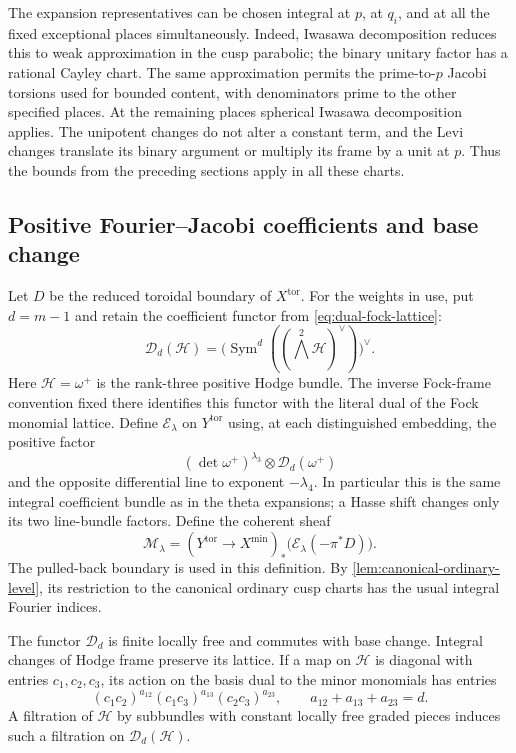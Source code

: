 The expansion representatives can be chosen integral at $p$, at
$q_i$, and at all the fixed exceptional places simultaneously.
Indeed, Iwasawa decomposition reduces this to weak approximation in
the cusp parabolic; the binary unitary factor has a rational Cayley
chart.  The same approximation permits the prime-to-$p$ Jacobi
torsions used for bounded content, with denominators prime to the
other specified places.  At the remaining places spherical Iwasawa
decomposition applies.  The unipotent changes do not alter a
constant term, and the Levi changes translate its binary argument
or multiply its frame by a unit at $p$.  Thus the bounds from the
preceding sections apply in all these charts.

\subsection{Positive Fourier--Jacobi coefficients and base change}

Let $D$ be the reduced toroidal boundary of $X^{\mathrm{tor}}$.
For the weights in use, put $d=m-1$ and retain the coefficient
functor from \cref{eq:dual-fock-lattice}:
\[
 \mathcal D_d(\mathcal H)
   =\bigl(\operatorname{Sym}^d
          ((\textstyle\bigwedge^2\mathcal H)^\vee)\bigr)^\vee.
\]
Here $\mathcal H=\omega^+$ is the rank-three positive Hodge bundle.
The inverse Fock-frame convention fixed there identifies this
functor with the literal dual of the Fock monomial lattice.  Define
$\mathcal E_\lambda$ on $Y^{\mathrm{tor}}$ using, at each
distinguished embedding, the positive factor
\[
       (\det\omega^+)^{\lambda_3}\otimes\mathcal D_d(\omega^+)
\]
and the opposite differential line to exponent $-\lambda_4$.
In particular this is the same integral coefficient bundle as in
the theta expansions; a Hasse shift changes only its two line-bundle
factors.  Define the coherent sheaf
\[
 \mathcal M_\lambda
 = (Y^{\mathrm{tor}}\longrightarrow X^{\min})_*
   \bigl(\mathcal E_\lambda(-\pi^*D)\bigr).
\]
The pulled-back boundary is used in this definition.  By
\cref{lem:canonical-ordinary-level}, its restriction to the canonical
ordinary cusp charts has the usual integral Fourier indices.

\begin{lemma}
\label{lem:dual-fock-functor}
The functor $\mathcal D_d$ is finite locally free and commutes with
base change.  Integral changes of Hodge frame preserve its lattice.
If a map on $\mathcal H$ is diagonal with entries $c_1,c_2,c_3$,
its action on the basis dual to the minor monomials has entries
\[
       (c_1c_2)^{a_{12}}(c_1c_3)^{a_{13}}
          (c_2c_3)^{a_{23}},
       \qquad a_{12}+a_{13}+a_{23}=d.
\]
A filtration of $\mathcal H$ by subbundles with constant locally
free graded pieces induces such a filtration on
$\mathcal D_d(\mathcal H)$.
\end{lemma}

